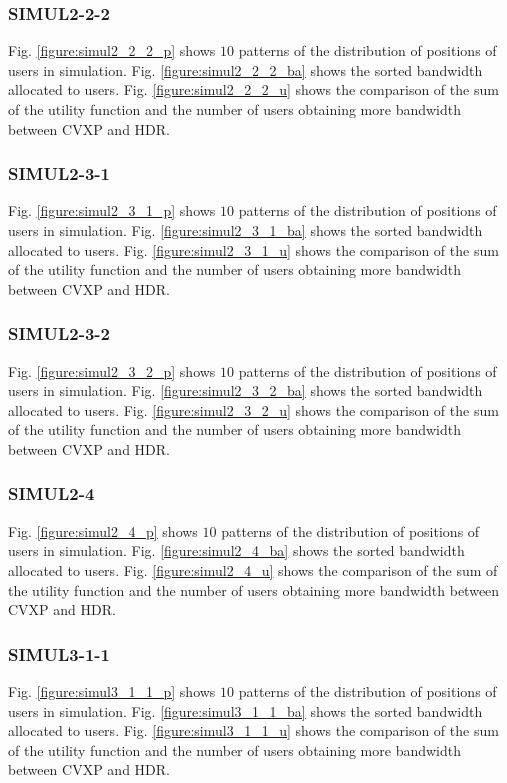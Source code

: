 \subsubsection{SIMUL2-2-2}
	Fig. \ref{figure:simul2_2_2_p} shows $10$ patterns of the distribution of positions of users in simulation. Fig. \ref{figure:simul2_2_2_ba} shows the sorted bandwidth allocated to users. Fig. \ref{figure:simul2_2_2_u} shows the comparison of the sum of the utility function and the number of users obtaining more bandwidth between CVXP and HDR.
	
\subsubsection{SIMUL2-3-1}
	Fig. \ref{figure:simul2_3_1_p} shows $10$ patterns of the distribution of positions of users in simulation. Fig. \ref{figure:simul2_3_1_ba} shows the sorted bandwidth allocated to users. Fig. \ref{figure:simul2_3_1_u} shows the comparison of the sum of the utility function and the number of users obtaining more bandwidth between CVXP and HDR.
	
\subsubsection{SIMUL2-3-2}
	Fig. \ref{figure:simul2_3_2_p} shows $10$ patterns of the distribution of positions of users in simulation. Fig. \ref{figure:simul2_3_2_ba} shows the sorted bandwidth allocated to users. Fig. \ref{figure:simul2_3_2_u} shows the comparison of the sum of the utility function and the number of users obtaining more bandwidth between CVXP and HDR.
	
\subsubsection{SIMUL2-4}
	Fig. \ref{figure:simul2_4_p} shows $10$ patterns of the distribution of positions of users in simulation. Fig. \ref{figure:simul2_4_ba} shows the sorted bandwidth allocated to users. Fig. \ref{figure:simul2_4_u} shows the comparison of the sum of the utility function and the number of users obtaining more bandwidth between CVXP and HDR.
	
\subsubsection{SIMUL3-1-1}
	Fig. \ref{figure:simul3_1_1_p} shows $10$ patterns of the distribution of positions of users in simulation. Fig. \ref{figure:simul3_1_1_ba} shows the sorted bandwidth allocated to users. Fig. \ref{figure:simul3_1_1_u} shows the comparison of the sum of the utility function and the number of users obtaining more bandwidth between CVXP and HDR.
	
